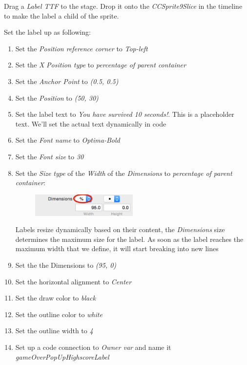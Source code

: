 \begin{leftbar}
Drag a \textit{Label TTF} to the stage. Drop it onto the
\textit{CCSprite9Slice} in the timeline to make the label a child of the sprite.

Set the label up as following:
\begin{enumerate}
  \item Set the \textit{Position reference corner} to \textit{Top-left}
  \item Set the \textit{X} \textit{Position type} to \textit{percentage of
  parent container}
  \item Set the \textit{Anchor Point} to \textit{(0.5, 0.5)}
  \item Set the \textit{Position} to \textit{(50, 30)}
  \item Set the label text to \textit{You have survived 10 seconds!}. This is a
  placeholder text. We'll set the actual text dynamically in code
  \item Set the \textit{Font name} to \textit{Optima-Bold}
  \item Set the \textit{Font size} to \textit{30}
  \item Set the \textit{Size type} of the \textit{Width} of the
  \textit{Dimensions} to \textit{percentage of parent container}:
  \begin{figure}[H]
    \centering
    \includegraphics[width=150pt]{images/Chapter7/set_dimensions.png}
  \end{figure} 
  Labels resize dynamically based on their content, the \textit{Dimensions} size
  determines the maximum size for the label. As soon as the label reaches the
  maximum width that we define, it will start breaking into new lines
  \item Set the the Dimensions to \textit{(95, 0)}
  \item Set the horizontal alignment to \textit{Center}
  \item Set the draw color to \textit{black}
  \item Set the outline color to \textit{white}
  \item Set the outline width to \textit{4}
  \item Set up a code connection to \textit{Owner var} and name it
  \textit{gameOverPopUpHighscoreLabel}
\end{enumerate}
\end{leftbar}

